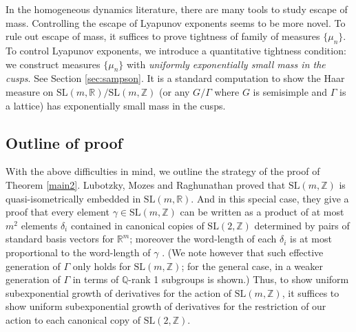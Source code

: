 \documentclass[10pt,reqno]{amsart}
\theoremstyle{Theorem}
\theoremstyle{definition}
\theoremstyle{remark}
\newcommand{\R}{\mathbb {R}}
\newcommand{\Q}{\mathbb {Q}}
\newcommand{\Z}{\mathbb {Z}}
\newcommand{\Sl}{\mathrm{SL}}
\begin{document}
In the  homogeneous dynamics literature, there  are many tools to study  escape of mass.  Controlling the escape of Lyapunov exponents seems to be more novel.  To rule out escape of mass, it suffices to prove  tightness of family of  measures $\{\mu_n\}.$
To control Lyapunov exponents, we introduce a quantitative tightness condition: we construct measures  $\{\mu_n\}$ with \emph{uniformly exponentially small mass in the cusps}. See Section \ref{sec:sampson}.
 It is a standard computation to show the Haar measure on $\Sl(m,\R)/\Sl(m,\Z)$  (or any  $G/\Gamma$ where $G$ is semisimple and $\Gamma$ is a lattice) has exponentially small mass in the cusps.  %

\subsection{Outline of proof} %
 With the above difficulties in mind, we outline   the strategy of the proof of Theorem \ref{main2}.  Lubotzky, Mozes and Raghunathan proved  that $\Sl(m, \Z)$ is quasi-isometrically embedded in $\Sl(m, \R)$.  And in this special case, they give a proof that every element  $\gamma\in \Sl(m, \Z)$ can be written   as a product of at most $m^2$ elements $\delta_i$ contained in  canonical copies of $\Sl(2, \Z)$ determined by pairs of standard basis vectors for $\R^m$; moreover the word-length of each $\delta_i$ is at most proportional to the word-length of $\gamma$ \cite[Corollary 3]{MR1244421}.  (We note however that such effective generation of $\Gamma$ only holds for $\Sl(m,\Z)$;  for  the general case, in  \cite{MR1828742} a weaker generation of $\Gamma$ in terms of $\Q$-rank 1 subgroups is shown.) Thus, to show uniform subexponential growth of derivatives for the action of $\Sl(m, \Z)$, it suffices to show uniform subexponential growth of derivatives for the restriction of our action to each canonical copy of $\Sl(2,\Z)$.
\end{document}
